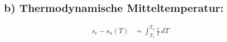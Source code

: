 \subsection*{b) Thermodynamische Mitteltemperatur:}

\begin{align*}
s_e - s_a (T) &= \int_{T_1}^{T_2} \frac{c}{T} \, dT
\end{align*}